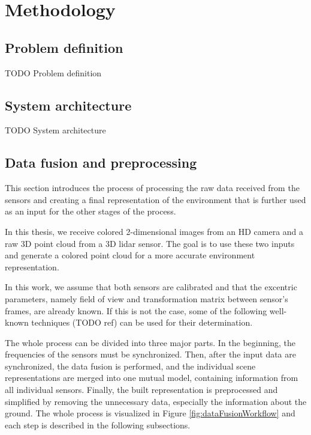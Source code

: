\chapter{Methodology}\label{chapter:methodology}


\section{Problem definition}

TODO Problem definition

\section{System architecture}

TODO System architecture

\section{Data fusion and preprocessing}

This section introduces the process of processing the raw data received from the sensors and creating a final representation of the environment that is further used as an input for the other stages of the process.\par
In this thesis, we receive colored 2-dimensional images from an HD camera and a raw 3D point cloud from a 3D lidar sensor. The goal is to use these two inputs and generate a colored point cloud for a more accurate environment representation.\par
In this work, we assume that both sensors are calibrated and that the excentric parameters, namely field of view and transformation matrix between sensor's frames, are already known. If this is not the case, some of the following well-known techniques (TODO ref) can be used for their determination.\par
The whole process can be divided into three major parts. In the beginning, the frequencies of the sensors must be synchronized. Then, after the input data are synchronized, the data fusion is performed, and the individual scene representations are merged into one mutual model, containing information from all individual sensors. Finally, the built representation is preprocessed and simplified by removing the unnecessary data, especially the information about the ground. The whole process is visualized in Figure \ref{fig:dataFusionWorkflow} and each step is described in the following subsections.

